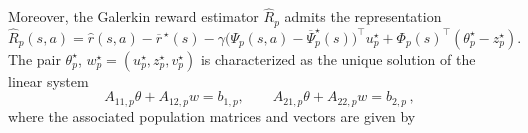 \documentclass{article}
\theoremstyle{definition}
\theoremstyle{remark}
\theoremstyle{plain}
\def\eqsp{\,}
\newcommand{\dsieve}{p}
\numberwithin{equation}{section}
\begin{document}
Moreover, the Galerkin reward estimator \(\widehat R_\dsieve\) admits the representation
\begin{equation}
\label{eq:Rk-coordinate-representation}
    \widehat R_\dsieve(s,a)
    =
    \widehat r(s,a)-\overline{r}^{\,\star}(s)
    -
    \gamma
    \bigl(
        \Psi_\dsieve(s,a)-\overline\Psi_\dsieve^\star(s)
    \bigr)^\top u_\dsieve^\star
    +
    \Phi_\dsieve(s)^\top
    (\theta_\dsieve^\star-z_\dsieve^\star).
\end{equation}
The pair \(
    \theta_{\dsieve}^\star\), 
    \(
      w^\star_{\dsieve} = (u_\dsieve^\star,z_\dsieve^\star,v_\dsieve^\star)
\) is characterized as the unique solution of the linear system
\begin{equation}
\label{eq:TTSA-population-form}
    A_{11,\dsieve}\theta+A_{12,\dsieve}w=b_{1,\dsieve},
    \qquad
    A_{21,\dsieve}\theta+A_{22,\dsieve}^{}w=b_{2,\dsieve}^{}\eqsp,
\end{equation}
where the associated population matrices and vectors are given by
\end{document}
